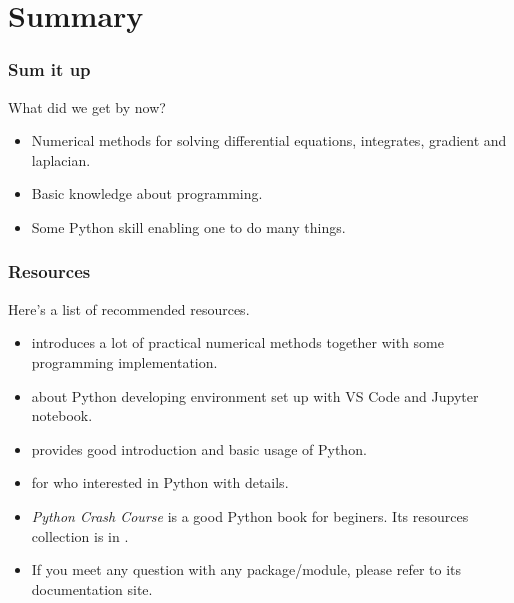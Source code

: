 \documentclass[compress,xcolor={dvipsnames}]{beamer}
\newcommand{\bhref}[2]{
    \href{#1}{\color{blue}{#2}}
}
\begin{document}
\section{Summary}
\begin{frame}
    \frametitle{Sum it up}
    What did we get by now?
    \begin{itemize}
        \item Numerical methods for solving differential equations, integrates, gradient and laplacian.
        \item Basic knowledge about programming.
        \item Some Python skill enabling one to do many things.
    \end{itemize}

\end{frame}
\begin{frame}[label=fm_resources]
    \frametitle{Resources}
    Here's a list of recommended resources.
    \begin{itemize}
        \item \bhref{https://ocw.mit.edu/ans7870/2/2.086/F14/MIT2_086S13_Textbook.pdf}{Math, Numerics, \& Programming (for Mechanical Engineers)}
        introduces a lot of practical numerical methods together with some programming implementation.
        \item \bhref{https://github.com/A-moment096/Python-with-VSCode}{My Github repository} about Python developing environment set up with VS Code
        and Jupyter notebook.
        \item \bhref{https://www.runoob.com/python3/python3-tutorial.html}{Runoob} provides good introduction and basic usage of Python.
        \item \bhref{https://www.python.org/doc/}{Python documentation set} for who interested in Python with details.
        \item  \emph{Python Crash Course} is a good Python book for beginers. Its resources collection is in \bhref{https://github.com/ehmatthes/pcc_3e}{Github}.
        \item If you meet any question with any package/module, please refer to its documentation site.
    \end{itemize}
\end{frame}
\end{document}
